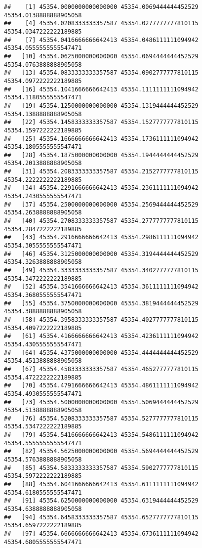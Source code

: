 \documentclass[
]{article}
\begin{document}
\begin{verbatim}
##    [1] 45354.0000000000000000 45354.0069444444452529 45354.0138888888905058
##    [4] 45354.0208333333357587 45354.0277777777810115 45354.0347222222189885
##    [7] 45354.0416666666642413 45354.0486111111094942 45354.0555555555547471
##   [10] 45354.0625000000000000 45354.0694444444452529 45354.0763888888905058
##   [13] 45354.0833333333357587 45354.0902777777810115 45354.0972222222189885
##   [16] 45354.1041666666642413 45354.1111111111094942 45354.1180555555547471
##   [19] 45354.1250000000000000 45354.1319444444452529 45354.1388888888905058
##   [22] 45354.1458333333357587 45354.1527777777810115 45354.1597222222189885
##   [25] 45354.1666666666642413 45354.1736111111094942 45354.1805555555547471
##   [28] 45354.1875000000000000 45354.1944444444452529 45354.2013888888905058
##   [31] 45354.2083333333357587 45354.2152777777810115 45354.2222222222189885
##   [34] 45354.2291666666642413 45354.2361111111094942 45354.2430555555547471
##   [37] 45354.2500000000000000 45354.2569444444452529 45354.2638888888905058
##   [40] 45354.2708333333357587 45354.2777777777810115 45354.2847222222189885
##   [43] 45354.2916666666642413 45354.2986111111094942 45354.3055555555547471
##   [46] 45354.3125000000000000 45354.3194444444452529 45354.3263888888905058
##   [49] 45354.3333333333357587 45354.3402777777810115 45354.3472222222189885
##   [52] 45354.3541666666642413 45354.3611111111094942 45354.3680555555547471
##   [55] 45354.3750000000000000 45354.3819444444452529 45354.3888888888905058
##   [58] 45354.3958333333357587 45354.4027777777810115 45354.4097222222189885
##   [61] 45354.4166666666642413 45354.4236111111094942 45354.4305555555547471
##   [64] 45354.4375000000000000 45354.4444444444452529 45354.4513888888905058
##   [67] 45354.4583333333357587 45354.4652777777810115 45354.4722222222189885
##   [70] 45354.4791666666642413 45354.4861111111094942 45354.4930555555547471
##   [73] 45354.5000000000000000 45354.5069444444452529 45354.5138888888905058
##   [76] 45354.5208333333357587 45354.5277777777810115 45354.5347222222189885
##   [79] 45354.5416666666642413 45354.5486111111094942 45354.5555555555547471
##   [82] 45354.5625000000000000 45354.5694444444452529 45354.5763888888905058
##   [85] 45354.5833333333357587 45354.5902777777810115 45354.5972222222189885
##   [88] 45354.6041666666642413 45354.6111111111094942 45354.6180555555547471
##   [91] 45354.6250000000000000 45354.6319444444452529 45354.6388888888905058
##   [94] 45354.6458333333357587 45354.6527777777810115 45354.6597222222189885
##   [97] 45354.6666666666642413 45354.6736111111094942 45354.6805555555547471

\end{verbatim}
\end{document}
